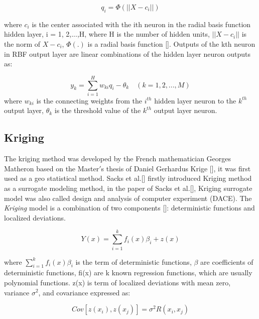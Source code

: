 \begin{equation}
q_{i} = \varPhi(|| X - c_{i} ||)
\end{equation}

where $ c_{i} $ is the center associated with the ith neuron in the radial basis function hidden layer, i = 1, 2,...,H, where H is the number of hidden units, $ || X - c_{i} || $ is the norm of $ X − c_{i} $, $ \varPhi (.) $ is a radial basis function []. Outputs of the kth neuron in RBF output layer are linear combinations of the hidden layer neuron outputs as:

\begin{equation}
y_{k} = \sum_{i=1}^{H} w_{ki} q_{i} - \theta _{k} \quad (k = 1, 2,...,M)
\end{equation}
where $ w_{ki} $ is the connecting weights from the $ i^{th} $ hidden layer neuron to the $ k^{th} $ output layer, $ \theta _{k} $ is the threshold value of the $ k^{th} $ output layer neuron.

\subsection{Kriging}
The kriging method was developed by the French mathematician Georges Matheron based on the Master$ ' $s thesis of Daniel Gerhardus Krige [], it was first used as a geo statistical method. Sacks et al.[] firstly introduced Kriging method as a surrogate modeling method, in the paper of Sacks et al.[], Kriging surrogate model was also called design and analysis of computer experiment (DACE). The \textit{Kriging} model is a combination of two components []: deterministic functions and localized deviations.

\begin{equation}
Y(x) = \sum_{i=1}^{k} f_{i} (x) \beta _{i} + z(x)
\end{equation}

where $ \sum_{i=1}^{k} f_{i} (x) \beta _{i} $ is the term of deterministic functions, $ \beta$ are coefficients of deterministic functions, fi(x) are k known regression functions, which are usually polynomial functions. z(x) is term of localized deviations with mean zero, variance $ \sigma ^2$, and covariance expressed as:

\begin{equation}
Cov[z(x_{i}),z(x_{j})] = \sigma ^{2} R (x_{i},x_{j})
\end{equation}

